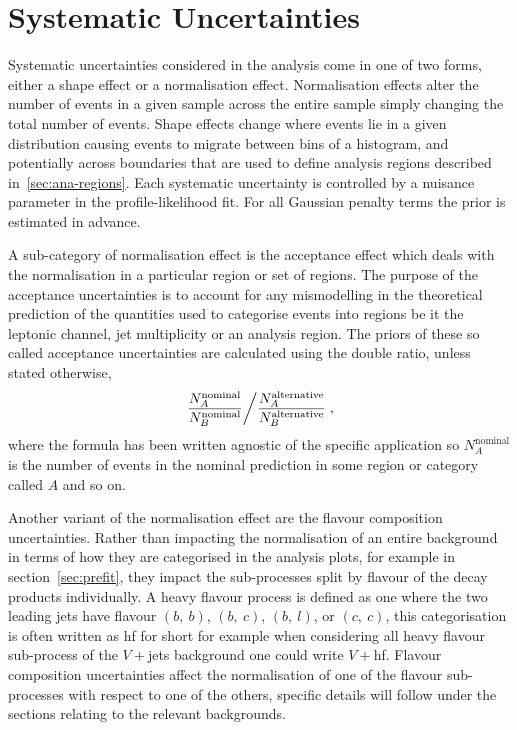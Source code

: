 \chapter{Systematic Uncertainties}%
\label{ch:systematics}

Systematic uncertainties considered in the analysis come in one of two forms,
either a shape effect or a normalisation effect. Normalisation effects alter the
number of events in a given sample across the entire sample simply changing the
total number of events. Shape effects change where events lie in a given
distribution causing events to migrate between bins of a histogram, and
potentially across boundaries that are used to define analysis regions described
in~\ref{sec:ana-regions}. Each systematic uncertainty is controlled by a
nuisance parameter in the profile-likelihood fit. For all Gaussian penalty terms
the prior is estimated in advance.

A sub-category of normalisation effect is the acceptance effect which deals with
the normalisation in a particular region or set of regions. The purpose of the
acceptance uncertainties is to account for any mismodelling in the theoretical
prediction of the quantities used to categorise events into regions be it the
leptonic channel, jet multiplicity or an analysis region. The priors of these so
called acceptance uncertainties are calculated using the double ratio, unless
stated otherwise,
\begin{equation}
  \left. \dfrac{N_{A}^{\text{nominal}}}{N_{B}^{\text{nominal}}} \middle/
    \dfrac{N_{A}^{\text{alternative}}}{N_{B}^{\text{alternative}}} \right.,
  \label{eq:acceptance-dr}
\end{equation}
where the formula has been written agnostic of the specific application so
$N_{A}^{\text{nominal}}$ is the number of  events in the nominal prediction in
some region or category called $A$ and so on.

Another variant of the normalisation effect are the flavour composition
uncertainties. Rather than impacting the normalisation of an entire background
in terms of how they are categorised in the analysis plots, for example in
section~\ref{sec:prefit}, they impact the sub-processes split by flavour of the
decay products individually. A heavy flavour process is defined as one where the
two leading jets have flavour $(b,~b)$, $(b,~c)$, $(b,~l)$, or $(c,~c)$,
this categorisation is often written as hf for short for example when
considering all heavy flavour sub-process of the $V+$jets background one could
write $V+$hf. Flavour composition uncertainties affect the normalisation of one
of the flavour sub-processes with respect to one of the others, specific details
will follow under the sections relating to the relevant backgrounds.

